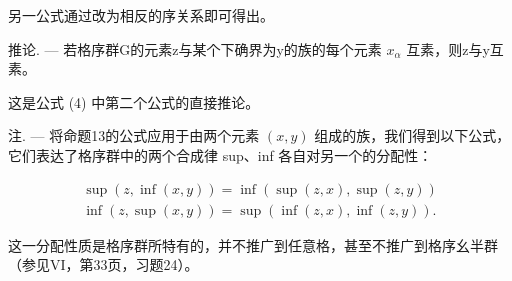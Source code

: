 另一公式通过改为相反的序关系即可得出。

推论. --- 若格序群G的元素z与某个下确界为y的族的每个元素 \(x_{\alpha}\) 互素，则z与y互素。

这是公式 (4) 中第二个公式的直接推论。

注. --- 将命题13的公式应用于由两个元素 \((x, y)\) 组成的族，我们得到以下公式，它们表达了格序群中的两个合成律 sup、inf 各自对另一个的分配性：

\[
\begin{array}{l} \sup (z, \inf (x, y)) = \inf (\sup (z, x), \sup (z, y)) \\ \inf (z, \sup (x, y)) = \sup (\inf (z, x), \inf (z, y)). \end{array}
\]

这一分配性质是格序群所特有的，并不推广到任意格，甚至不推广到格序幺半群（参见VI，第33页，习题24）。

